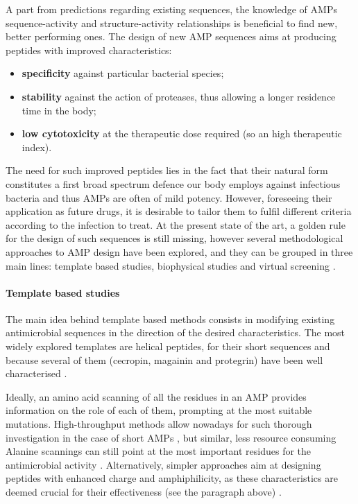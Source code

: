 A part from predictions regarding existing sequences, the knowledge of AMPs sequence-activity and structure-activity relationships is beneficial to find new, better performing ones. The design of new AMP sequences aims at producing peptides with improved characteristics:
\begin{itemize}
\item \textbf{specificity} against particular bacterial species;
\item \textbf{stability} against the action of proteases, thus allowing a longer residence time in the body;
\item \textbf{low cytotoxicity} at the therapeutic dose required (so an high therapeutic index).
\end{itemize}
The need for such improved peptides lies in the fact that their natural form constitutes a first broad spectrum defence our body employs against infectious bacteria and thus AMPs are often of mild potency. However, foreseeing their application as future drugs, it is desirable to tailor them to fulfil different criteria according to the infection to treat.
%
At the present state of the art, a golden rule for the design of such sequences is still missing, however several methodological approaches to AMP design have been explored, and they can be grouped in three main lines: template based studies, biophysical studies and virtual screening \cite{Fjell2011}.

\paragraph{Template based studies}
The main idea behind template based methods consists in modifying existing antimicrobial sequences in the direction of the desired characteristics. The most widely explored templates are helical peptides, for their short sequences and because several of them (cecropin, magainin and protegrin) have been well characterised \cite{Wang2015}.

Ideally, an amino acid scanning of all the residues in an AMP provides information on the role of each of them, prompting at the most suitable mutations. High-throughput methods allow nowadays for such thorough investigation in the case of short AMPs \cite{Hilpert2005}, but similar, less resource consuming Alanine scannings can still point at the most important residues for the antimicrobial activity \cite{Migon2018}.
%
Alternatively, simpler approaches aim at designing peptides with enhanced charge and amphiphilicity, as these characteristics are deemed crucial for their effectiveness (see the paragraph above) \cite{Wang2015}.

